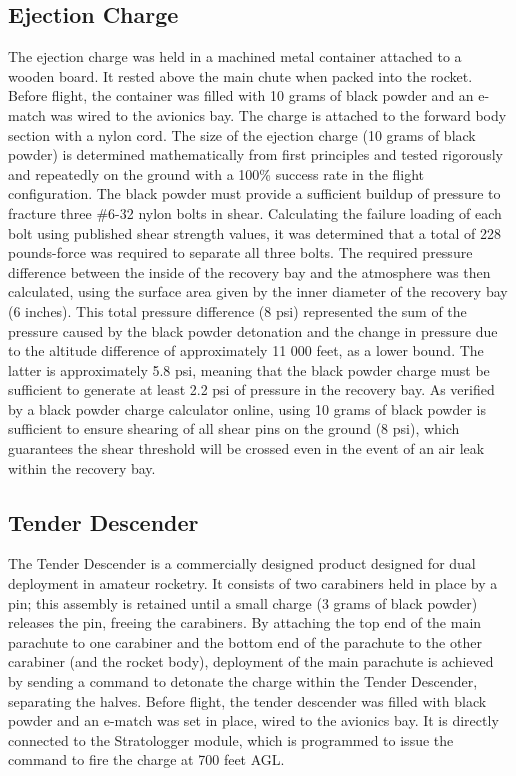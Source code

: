 \subsection{Ejection Charge} %
\label{sub:ejection_charge}
The ejection charge was held in a machined metal container attached to a wooden board. It rested above the main chute when packed into the rocket. Before flight, the container was filled with 10 grams of black powder and an e-match was wired to the avionics bay. The charge is attached to the forward body section with a nylon cord. 
\newline\newline
The size of the ejection charge (10 grams of black powder) is determined mathematically from first principles and tested rigorously and repeatedly on the ground with a 100\% success rate in the flight configuration. The black powder must provide a sufficient buildup of pressure to fracture three \#6-32 nylon bolts in shear. Calculating the failure loading of each bolt using published shear strength values, it was determined that a total of 228 pounds-force was required to separate all three bolts. The required pressure difference between the inside of the recovery bay and the atmosphere was then calculated, using the surface area given by the inner diameter of the recovery bay (6 inches). This total pressure difference (8 psi) represented the sum of the pressure caused by the black powder detonation and the change in pressure due to the altitude difference of approximately 11 000 feet, as a lower bound. The latter is approximately 5.8 psi, meaning that the black powder charge must be sufficient to generate at least 2.2 psi of pressure in the recovery bay. As verified by a black powder charge calculator online, using 10 grams of black powder is sufficient to ensure shearing of all shear pins on the ground (8 psi), which guarantees the shear threshold will be crossed even in the event of an air leak within the recovery bay.
\subsection{Tender Descender} %
\label{sub:tender_descender}
The Tender Descender is a commercially designed product designed for dual deployment in amateur rocketry. It consists of two carabiners held in place by a pin; this assembly is retained until a small charge (3 grams of black powder) releases the pin, freeing the carabiners. By attaching the top end of the main parachute to one carabiner and the bottom end of the parachute to the other carabiner (and the rocket body), deployment of the main parachute is achieved by sending a command to detonate the charge within the Tender Descender, separating the halves. Before flight, the tender descender was filled with black powder and an e-match was set in place, wired to the avionics bay. It is directly connected to the Stratologger module, which is programmed to issue the command to fire the charge at 700 feet AGL.

